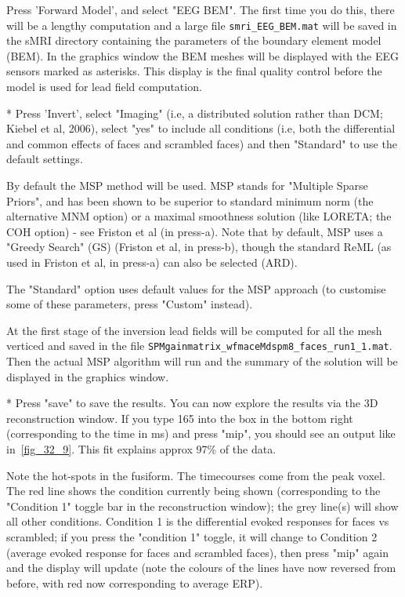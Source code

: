 \noindent * Press 'Forward Model', and select "EEG BEM". The first time you do this, there will be a lengthy computation and a large file \verb!smri_EEG_BEM.mat! will be saved in the sMRI directory containing the parameters of the boundary element model (BEM). In the graphics window the BEM meshes will be displayed with the EEG sensors marked as asterisks. This display is the final quality control before the model is used for lead field computation.

* Press 'Invert', select "Imaging" (i.e, a distributed solution rather than DCM; Kiebel et al, 2006), select "yes" to include all conditions (i.e, both the differential and common effects of faces and scrambled faces) and then "Standard" to use the default settings.

By default the MSP method will be used. MSP stands for "Multiple Sparse Priors", and has been shown to be superior to standard minimum norm (the alternative MNM option) or a maximal smoothness solution (like LORETA; the COH option) - see Friston et al (in press-a). Note that by default, MSP uses a "Greedy Search" (GS) (Friston et al, in press-b), though the standard ReML (as used in Friston et al, in press-a) can also be selected (ARD).

The "Standard" option uses default values for the MSP approach (to customise some of these parameters, press "Custom" instead). 

At the first stage of the inversion lead fields will be computed for all the mesh verticed and saved in the file \verb!SPMgainmatrix_wfmaceMdspm8_faces_run1_1.mat!. Then the actual MSP algorithm will run and the summary of the solution will be displayed in the graphics window.

* Press "save" to save the results. You can now explore the results via the 3D reconstruction window. If you type 165 into the box in the bottom right (corresponding to the time in ms) and press "mip", you should see an output like in~\ref{fig_32_9}. This fit explains approx 97\% of the data.

Note the hot-spots in the fusiform. The timecourses come from the peak voxel. The red line shows the condition currently being shown (corresponding to the "Condition 1" toggle bar in the reconstruction window); the grey line(s) will show all other conditions. Condition 1 is the differential evoked responses for faces vs scrambled; if you press the "condition 1" toggle, it will change to Condition 2 (average evoked response for faces and scrambled faces), then press "mip" again and the display will update (note the colours of the lines have now reversed from before, with red now corresponding to average ERP).

